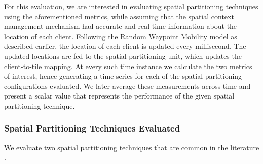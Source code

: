 \par For this evaluation, we are interested in evaluating spatial partitioning techniques using the aforementioned metrics, while assuming that the spatial context management mechanism had accurate and real-time information about the location of each client. Following the Random Waypoint Mobility model as described earlier, the location of each client is updated every millisecond. The updated locations are fed to the spatial partitioning unit, which updates the client-to-tile mapping. At every such time instance we calculate the two metrics of interest, hence generating a time-series for each of the spatial partitioning configurations evaluated. We later average these measurements across time and present a scalar value that represents the performance of the given spatial partitioning technique.

\subsubsection{Spatial Partitioning Techniques Evaluated}
We evaluate two spatial partitioning techniques that are common in the literature \cite{}.

